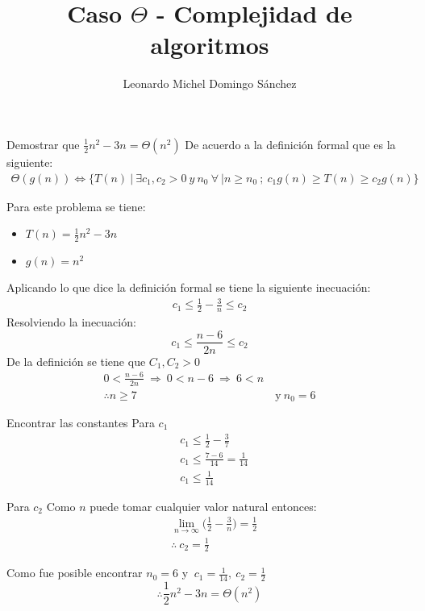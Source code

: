 \documentclass[11pt,letterpaper,fleqn]{article}
\title{Caso $\Theta$ - Complejidad de algoritmos}
\author{Leonardo Michel Domingo Sánchez}
\begin{document}
\maketitle
Demostrar que $\frac{1}{2}n^{2} - 3n = \Theta(n^{2}) $ \smallbreak
De acuerdo a la definición formal que es la siguiente:
\begin{equation*}
\begin{aligned}
	\Theta(g(n)) \Leftrightarrow \{ T(n) \ | \ \exists c_{1},c_{2} > 0 \ y \ n_{0} \ \forall \ | n \geq n_{0} \ ; \ c_{1} g(n) \geq T(n) \geq c_{2}g(n)\}
\end{aligned}
\end{equation*}

Para este problema se tiene: 
\begin{itemize}
    \item $T(n) = \frac{1}{2} n^{2} - 3n$
    \item $ g(n) = n^{2} $
\end{itemize}

Aplicando lo que dice la definición formal se tiene la siguiente inecuación:
\begin{equation*}
\begin{aligned}
    c_{1} \leq \frac{1}{2} - \frac{3}{n} \leq c_{2}
\end{aligned}
\end{equation*}
Resolviendo la inecuación:
\begin{equation*}
    c_{1} \leq \frac{n-6}{2n} \leq c_{2} 
\end{equation*}
De la definición se tiene que $C_{1}, C_{2} > 0 $
\begin{equation*}
\begin{aligned}
    0 < \frac{n-6}{2n} \ \Rightarrow \ 0 < n-6 \ \Rightarrow \ 6 < n \\
    \therefore n \geq 7& \ \text{y} \ n_{0} = 6
\end{aligned}
\end{equation*}

Encontrar las constantes
Para $c_{1}$
\begin{equation*}
\begin{aligned}
    &c_{1} \leq \frac{1}{2} - \frac{3}{7} \\
    &c_{1} \leq \frac{7-6}{14} = \frac{1}{14} \\
    &c_{1} \leq \frac{1}{14}
\end{aligned}
\end{equation*}

Para $c_{2}$
Como $n$ puede tomar cualquier valor natural entonces:
\begin{equation*}
\begin{aligned}
    &\lim\limits_{n \rightarrow \infty} \Bigg(\frac{1}{2} - \frac{3}{n}\Bigg) = \frac{1}{2} \\
    &\therefore \ c_{2} = \frac{1}{2}
\end{aligned}
\end{equation*}

Como fue posible encontrar $n_{0} = 6$ y $\ c_{1}=\frac{1}{14}, \ c_{2} = \frac{1}{2}$
$$\therefore \frac{1}{2}n^{2}-3n = \Theta(n^{2})$$
\end{document}
